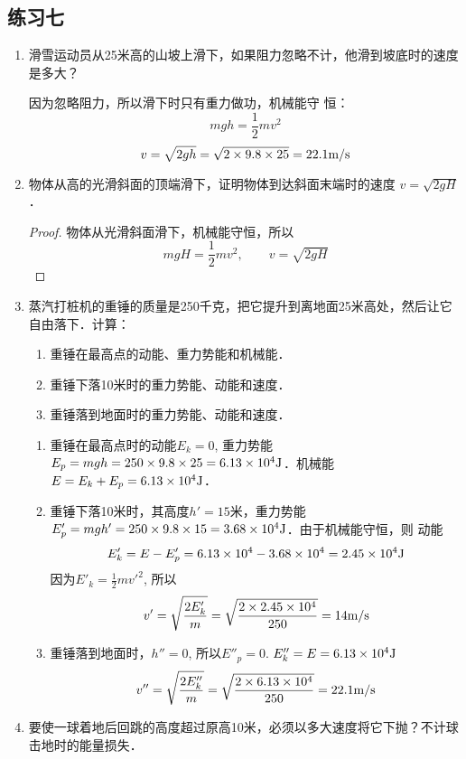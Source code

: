 \subsection{练习七}
\begin{enumerate}
    \item 滑雪运动员从25米高的山坡上滑下，如果阻力忽略不计，他滑到坡底时的速度是多大？

    \begin{solution}
        因为忽略阻力，所以滑下时只有重力做功，机械能守
        恒：
\[    mgh=\frac{1}{2}mv^2\]
      \[  v=\sqrt{2gh}=\sqrt{2\times9.8\times25}=22.1\text{m}/\text{s}\]
    \end{solution}
    \item 物体从高的光滑斜面的顶端滑下，证明物体到达斜面末端时的速度 $v=\sqrt{2gH}$．

    \begin{proof}
        物体从光滑斜面滑下，机械能守恒，所以
        \[mgH=\frac{1}{2}mv^2,\qquad v=\sqrt{2gH}\]
    \end{proof}
    \item 蒸汽打桩机的重锤的质量是250千克，把它提升到离地面25米高处，然后让它自由落下．计算：
    \begin{enumerate}
        \item 重锤在最高点的动能、重力势能和机械能．
        \item 重锤下落10米时的重力势能、动能和速度．
        \item 重锤落到地面时的重力势能、动能和速度．
    \end{enumerate}

    \begin{solution}
\begin{enumerate}
    \item 重锤在最高点时的动能$E_k=0$, 重力势能$E_p=
    mgh=250\times9.8\times25=6.13\times10^4{\rm J}$．机械能$E=E_k+E_p=
    6.13\times10^4{\rm J}$．
    \item 重锤下落10米时，其高度$h'=15$米，重力势能$E'_p=
    mgh'=250\times9.8\times15=3.68\times10^4{\rm J}$．由于机械能守恒，则
    动能
    \[E'_k=E-E'_p=6.13\times10^4-3.68\times10^4=2.45\times10^4{\rm J}\]
    因为$E'_k=\frac{1}{2}m{v'}^2$, 所以
\[v'=\sqrt{\frac{2E_k'}{m}}=\sqrt{\frac{2\times 2.45\times 10^4}{250}}=14\text{m}/\text{s}\]
    \item 重锤落到地面时，$h''=0$, 所以$E''_p=0$.
    $E''_k=E=6.13\times10^4{\rm J}$
    \[v''=\sqrt{\frac{2E_k''}{m}}=\sqrt{\frac{2\times 6.13\times 10^4}{250}}=22.1\text{m}/\text{s}\]
\end{enumerate}
    \end{solution}
\item 要使一球着地后回跳的高度超过原高10米，必须以多大速度将它下抛？不计球击地时的能量损失．


\end{enumerate}
